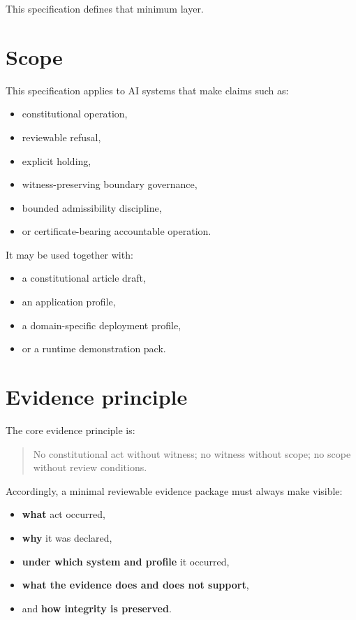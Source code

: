 \documentclass[11pt]{article}
\begin{document}
This specification defines that minimum layer.

\section{Scope}

This specification applies to AI systems that make claims such as:
\begin{itemize}[leftmargin=2em]
    \item constitutional operation,
    \item reviewable refusal,
    \item explicit holding,
    \item witness-preserving boundary governance,
    \item bounded admissibility discipline,
    \item or certificate-bearing accountable operation.
\end{itemize}

It may be used together with:
\begin{itemize}[leftmargin=2em]
    \item a constitutional article draft,
    \item an application profile,
    \item a domain-specific deployment profile,
    \item or a runtime demonstration pack.
\end{itemize}

\section{Evidence principle}

The core evidence principle is:

\begin{quote}
No constitutional act without witness; no witness without scope; no scope without review conditions.
\end{quote}

Accordingly, a minimal reviewable evidence package must always make visible:
\begin{itemize}[leftmargin=2em]
    \item \textbf{what} act occurred,
    \item \textbf{why} it was declared,
    \item \textbf{under which system and profile} it occurred,
    \item \textbf{what the evidence does and does not support},
    \item and \textbf{how integrity is preserved}.
\end{itemize}
\end{document}
